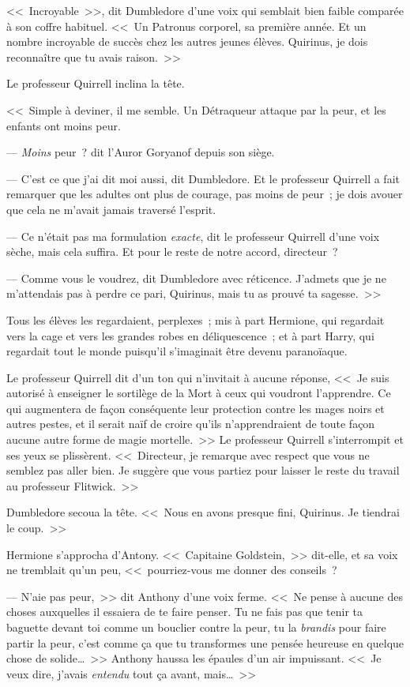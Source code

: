 <<~Incroyable~>>, dit Dumbledore d'une voix qui semblait bien faible comparée à son coffre habituel. <<~Un Patronus corporel, sa première année. Et un nombre incroyable de succès chez les autres jeunes élèves. Quirinus, je dois reconnaître que tu avais raison.~>>

Le professeur Quirrell inclina la tête.

<<~Simple à deviner, il me semble. Un Détraqueur attaque par la peur, et les enfants ont moins peur.

--- \emph{Moins} peur~? dit l'Auror Goryanof depuis son siège.

--- C'est ce que j'ai dit moi aussi, dit Dumbledore. Et le professeur Quirrell a fait remarquer que les adultes ont plus de courage, pas moins de peur~; je dois avouer que cela ne m'avait jamais traversé l'esprit.

--- Ce n'était pas ma formulation \emph{exacte}, dit le professeur Quirrell d'une voix sèche, mais cela suffira. Et pour le reste de notre accord, directeur~?

--- Comme vous le voudrez, dit Dumbledore avec réticence. J'admets que je ne m'attendais pas à perdre ce pari, Quirinus, mais tu as prouvé ta sagesse.~>>

Tous les élèves les regardaient, perplexes~; mis à part Hermione, qui regardait vers la cage et vers les grandes robes en déliquescence~; et à part Harry, qui regardait tout le monde puisqu'il s'imaginait être devenu paranoïaque.

Le professeur Quirrell dit d'un ton qui n'invitait à aucune réponse, <<~Je suis autorisé à enseigner le sortilège de la Mort à ceux qui voudront l'apprendre. Ce qui augmentera de façon conséquente leur protection contre les mages noirs et autres pestes, et il serait naïf de croire qu'ils n'apprendraient de toute façon aucune autre forme de magie mortelle.~>> Le professeur Quirrell s'interrompit et ses yeux se plissèrent. <<~Directeur, je remarque avec respect que vous ne semblez pas aller bien. Je suggère que vous partiez pour laisser le reste du travail au professeur Flitwick.~>>

Dumbledore secoua la tête. <<~Nous en avons presque fini, Quirinus. Je tiendrai le coup.~>>

Hermione s'approcha d'Antony. <<~Capitaine Goldstein,~>> dit-elle, et sa voix ne tremblait qu'un peu, <<~pourriez-vous me donner des conseils~?

--- N'aie pas peur,~>> dit Anthony d'une voix ferme. <<~Ne pense à aucune des choses auxquelles il essaiera de te faire penser. Tu ne fais pas que tenir ta baguette devant toi comme un bouclier contre la peur, tu la \emph{brandis} pour faire partir la peur, c'est comme ça que tu transformes une pensée heureuse en quelque chose de solide…~>> Anthony haussa les épaules d'un air impuissant. <<~Je veux dire, j'avais \emph{entendu} tout ça avant, mais…~>>

